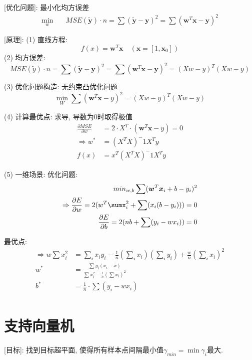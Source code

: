 \documentclass{article}
\begin{document}
		[优化问题]: 最小化均方误差
    		\begin{align*}
    			\min_w  &\quad	MSE(\tilde{\boldsymbol y}) · n = \sum (\tilde {\boldsymbol y} -\boldsymbol y)^2 = \sum (\boldsymbol w^T \boldsymbol x - \boldsymbol y)^2
    		\end{align*}
    		
		[原理]:
			(1) 直线方程: $$f(x) = \boldsymbol w^T \boldsymbol x	\quad (\boldsymbol x = [1, \boldsymbol x_0])$$
			(2) 均方误差:
					$$MSE(\tilde y) · n = \sum (\tilde {\boldsymbol y} -\boldsymbol y)^2 = \sum (\boldsymbol w^T \boldsymbol x - \boldsymbol y)^2 = (X w - y)^T (X w - y)$$
					
			(3) 优化问题构造: 无约束凸优化问题
					$$\min_W	\sum (\boldsymbol w^T \boldsymbol x - y)^2 = (X w - y)^T (X w - y)$$
					
			(4) 计算最优点: 求导, 导数为0时取得极值
				\begin{align*}
					\frac{\partial MSE}{\partial w} &= 2·X^T·(\boldsymbol w^T \boldsymbol x - y) = 0\\
				\Rightarrow	w^* &= (X^T X)^-1 X^T y\\
					f(x) &= x^T (X^T X)^-1 X^T y
				\end{align*}
				
			(5) 一维场景:
				优化问题:
				\begin{align*}
					min_{w,b}	\sum (\boldsymbol w^T \boldsymbol x_i + b - y_i)^2\\
				    \Rightarrow	\frac{\partial E}{\partial w} = 2( w^T \sumx_i^2 + \sum(x_i(b - y_i)) )	= 0\\
					\frac{\partial E}{\partial b} = 2( n b + \sum(y_i - w x_i) ) = 0
				\end{align*}
				
				最优点:
				\begin{align*}
				    \Rightarrow w \sum x_i^2 &= \sum_i x_i y_i - \frac{1}{n} \left(\sum_i x_i \right) \left(\sum_i y_i\right) + \frac{w}{n} \left(\sum_i x_i\right)^2\\
					w^* &= \frac{\sum y_i(x_i - \bar x)}{\sum x_i^2 - \frac{1}{n} (\sum x_i)^2}\\
					b^* &= \frac{1}{n}·\sum(y_i - w x_i)\\
				\end{align*}

					
\section{支持向量机}
		[目标]: 找到目标超平面, 使得所有样本点间隔最小值$\gamma_{min} = \min \gamma_i$最大.
		
\end{document}
